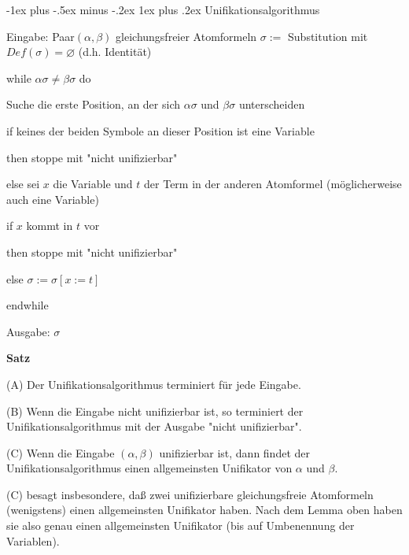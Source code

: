 \documentclass[a4paper]{article}
\makeatletter
\renewcommand{\note}[2]{\begin{noteBox} \textbf{#1} #2 \end{noteBox}}
\renewcommand{\subsubsection}{\@startsection{subsubsection}{3}{0mm}%
                {-1ex plus -.5ex minus -.2ex}%
                {1ex plus .2ex}%
                {\normalfont\small\bfseries}}
\makeatother
\begin{document}
\begin{multicols}{3}
  \subsubsection{Unifikationsalgorithmus}
  \begin{itemize*}
    \item Eingabe: Paar$(\alpha,\beta)$ gleichungsfreier Atomformeln $\sigma:=$ Substitution mit $Def(\sigma)=\varnothing$ (d.h. Identität)
    \item while $\alpha\sigma\not =\beta\sigma$ do
    \begin{itemize*}
      \item Suche die erste Position, an der sich $\alpha\sigma$ und $\beta\sigma$ unterscheiden
      \item if keines der beiden Symbole an dieser Position ist eine Variable
      \item then stoppe mit "nicht unifizierbar"
      \item else sei $x$ die Variable und $t$ der Term in der anderen Atomformel (möglicherweise auch eine Variable)
      \begin{itemize*}
        \item if $x$ kommt in $t$ vor
        \item then stoppe mit "nicht unifizierbar"
        \item else $\sigma:=\sigma[x:=t]$
      \end{itemize*}
    \end{itemize*}
    \item endwhile
    \item Ausgabe: $\sigma$
  \end{itemize*}

  \note{Satz}{
    \begin{itemize*}
      \item (A) Der Unifikationsalgorithmus terminiert für jede Eingabe.
      \item (B) Wenn die Eingabe nicht unifizierbar ist, so terminiert der Unifikationsalgorithmus mit der Ausgabe "nicht unifizierbar".
      \item (C) Wenn die Eingabe $(\alpha,\beta)$ unifizierbar ist, dann findet der Unifikationsalgorithmus einen allgemeinsten Unifikator von $\alpha$ und $\beta$.
    \end{itemize*}
  }

  (C) besagt insbesondere, daß zwei unifizierbare gleichungsfreie Atomformeln (wenigstens) einen allgemeinsten Unifikator haben. Nach dem Lemma oben haben sie also genau einen allgemeinsten Unifikator (bis auf Umbenennung der Variablen).


\end{multicols}
\end{document}

